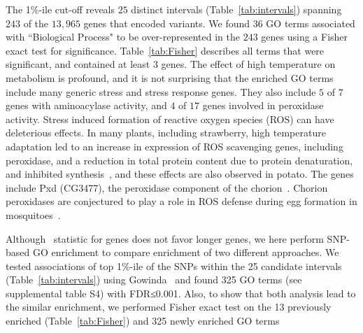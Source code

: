 \documentclass[11pt]{article}
\def\comale{\text{{\sc Comale}}}
\begin{document}
The 1\%-ile cut-off reveals $25$ distinct intervals 
(Table~\ref{tab:intervals})  spanning $243$ of 
the $13,965$ genes that encoded
variants. We found $36$ GO terms associated with ``Biological Process" to be 
over-represented in the $243$ genes using a Fisher exact
test for significance. Table~\ref{tab:Fisher} describes all terms that
were significant, and contained at least $3$ genes. The
effect of high temperature on metabolism is profound, and it is not
surprising that the enriched GO terms include many generic stress and
stress response genes. They also include $5$ of $7$ genes with
aminoacylase activity, and $4$ of $17$ genes involved in peroxidase
activity. Stress induced formation of reactive oxygen species (ROS)
can have deleterious effects. In many plants, including strawberry,
high temperature adaptation led to an increase in expression of ROS
scavenging genes, including peroxidase, and a reduction in total
protein content due to protein denaturation, and inhibited
synthesis~\cite{gulen2004effect}, and these effects are also observed in
potato. The genes include Pxd (CG3477), the peroxidase component of the
chorion~\cite{konstandi2005enzymatic}. Chorion peroxidases are conjectured
to play a role in ROS defense during egg formation in 
mosquitoes~\cite{li2006major}. 

Although \comale\ statistic for genes does not favor longer genes, we here 
perform SNP-based
GO enrichment to compare enrichment of two different approaches. We tested 
associations of top
1\%-ile of the SNPs within the 25 candidate intervals 
(Table~\ref{tab:intervals}) using Gowinda~\cite{kofler2012gowinda} and found 325
GO terms (see supplemental table S4) with FDR≤0.001. Also, to show that both 
analysis lead to
the similar enrichment, we performed Fisher exact test on the 13 previously 
enriched (Table~\ref{tab:Fisher}) and
325 newly enriched GO terms

\end{document}

